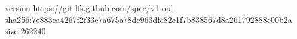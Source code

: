 version https://git-lfs.github.com/spec/v1
oid sha256:7e883ea4267f2f33e7a675a78dc963dfc82c1f7b838567d8a261792888c00b2a
size 262240
